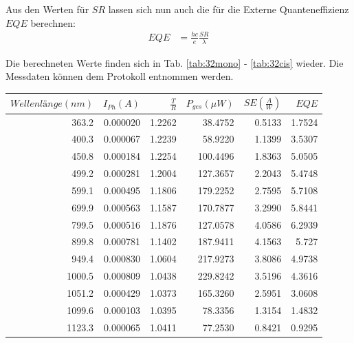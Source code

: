 Aus den Werten für $SR$ lassen sich nun auch die für die Externe Quanteneffizienz $EQE$ berechnen:
\begin{align}
EQE &= \frac{hc}{e} \frac{SR}{\lambda}
\label{eq:eqe}
\end{align}

Die berechneten Werte finden sich in Tab. \ref{tab:32mono} - \ref{tab:32cis} wieder. Die Messdaten können dem Protokoll entnommen werden.
\\

\begin{center}
\begin{tabular}{rrrrrr}
    $Wellenlänge (nm)$ &  $I_{Ph} (A)$ &    $\frac{T}{R}$ &  $P_{ges} (\mu W)$ &  $SE (\frac{A}{W})$ &       $EQE$ \\
    \hline
    363.2 &  0.000020 &  1.2262 &   38.4752 &  0.5133 &   1.7524 \\
    400.3 &  0.000067 &  1.2239 &   58.9220 &  1.1399 &   3.5307 \\
    450.8 &  0.000184 &  1.2254 &  100.4496 &  1.8363 &   5.0505 \\
    499.2 &  0.000281 &  1.2004 &  127.3657 &  2.2043 &   5.4748 \\
    599.1 &  0.000495 &  1.1806 &  179.2252 &  2.7595 &   5.7108 \\
    699.9 &  0.000563 &  1.1587 &  170.7877 &  3.2990 &   5.8441 \\
    799.5 &  0.000516 &  1.1876 &  127.0578 &  4.0586 &   6.2939 \\
    899.8 &  0.000781 &  1.1402 &  187.9411 &  4.1563 &     5.727 \\
    949.4 &  0.000830 &  1.0604 &  217.9273 &  3.8086 &   4.9738 \\
    1000.5 &  0.000809 &  1.0438 &  229.8242 &  3.5196 &   4.3616 \\
    1051.2 &  0.000429 &  1.0373 &  165.3260 &  2.5951 &   3.0608 \\
    1099.6 &  0.000103 &  1.0395 &   78.3356 &  1.3154 &    1.4832 \\
    1123.3 &  0.000065 &  1.0411 &   77.2530 &  0.8421 &  0.9295 \\
\end{tabular}
\label{tab:32mono}
\end{center}

